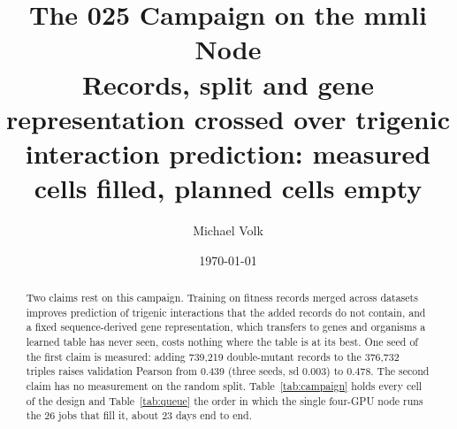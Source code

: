 \documentclass[10pt,a4paper]{article}
\title{\vspace{-1.5em}The 025 Campaign on the mmli Node\\
  {\large Records, split and gene representation crossed over trigenic interaction
   prediction: measured cells filled, planned cells empty}}
\author{Michael Volk}
\date{\today}
\begin{document}
\maketitle
\thispagestyle{empty}

\begin{abstract}
\noindent
Two claims rest on this campaign. Training on fitness records merged across datasets
improves prediction of trigenic interactions that the added records do not contain, and a
fixed sequence-derived gene representation, which transfers to genes and organisms a
learned table has never seen, costs nothing where the table is at its best. One seed of the
first claim is measured: adding 739{,}219 double-mutant records to the 376{,}732 triples
raises validation Pearson from 0.439 (three seeds, sd 0.003) to 0.478. The second claim
has no measurement on the random split. Table~\ref{tab:campaign} holds every cell of the
design and Table~\ref{tab:queue} the order in which the single four-GPU node runs the 26
jobs that fill it, about 23 days end to end.
\end{abstract}

\vspace{0.5em}
\tccontents
\clearpage




\end{document}
